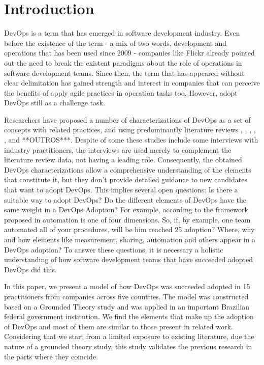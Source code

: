 \section{Introduction}

DevOps is a term that has emerged in software development industry. Even before
the existence of the term - a mix of two words, development and operations that
has been used since 2009 - companies like Flickr \cite{flickr} already
pointed out the need to break the existent paradigms about the role of
operations in software development teams. Since then, the term that has appeared
without clear delimitation has gained strength and interest in companies that
can perceive the benefits of apply agile practices in operation tasks too.
However, adopt DevOps still as a challenge task.

Researchers have proposed a number of characterizations of DevOps as a set of
concepts with related practices, and using predominantly literature reviews
\cite{cooperation_between_esem_14}, \cite{devops_a_definition_xp_15},
\cite{dimensions_of_devops_xp_15}, \cite{extending_dimensions_icsea_16},
\cite{characterizing_devops_sbes_2016}, \cite{a_qualitative_study_journal_sw_17}
and **OUTROS***. Despite of some these studies include some interviews with industry
practitioners, the interviews are used merely to complement the literature
review data, not having a leading role. Consequently, the obtained DevOps
characterizations allow a comprehensive understanding of the elements that
constitute it, but they don't provide detailed guidance to new candidates that
want to adopt DevOps. This implies several open questions: Is there a suitable
way to adopt DevOps? Do the different elements of DevOps have the same weight
in a DevOps Adoption? For example, according to the framework proposed in
\cite{dimensions_xp_2015} automation is one of four dimensions. So, if, by example,
one team automated all of your procedures, will be him reached 25%
adoption? Where, why and how elements like measurement, sharing, automation and
others appear in a DevOps adoption? To answer these questions, it is necessary a
holistic understanding of how software development teams that have succeeded
adopted DevOps did this.

In this paper, we present a model of how DevOps was succeeded adopted in 15
practitioners from companies across five countries. The model was constructed
based on a Grounded Theory study and was applied in an important Brazilian
federal government institution. We find the elements that make up the adoption
of DevOps and most of them are similar to those present in related work.
Considering that we start from a limited exposure to existing literature,
due the nature of a grounded theory study, this study validates the previous
research in the parts where they coincide.

